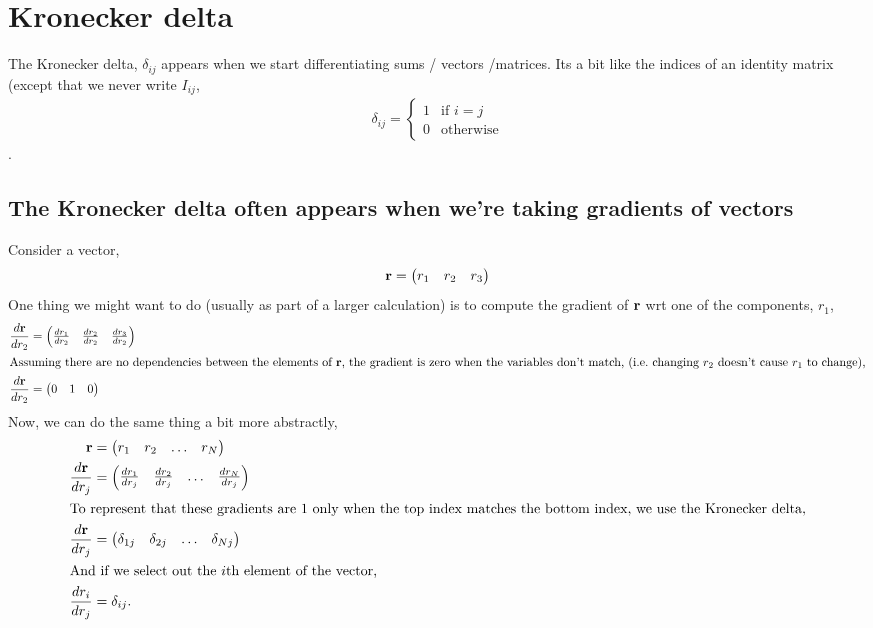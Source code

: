 \documentclass{article}
\newcommand{\dt}[2][]{\frac{d #1}{d #2}}
\begin{document}
\section{Kronecker delta}
The Kronecker delta, $\delta_{ij}$ appears when we start differentiating sums / vectors /matrices.
Its a bit like the indices of an identity matrix (except that we never write $I_{ij}$,
\begin{align}
  \delta_{ij} = \begin{cases}
    1 & \text{if } i=j\\
    0 & \text{otherwise}
  \end{cases}
\end{align}.

\subsection{The Kronecker delta often appears when we're taking gradients of vectors}
Consider a vector,
\begin{align}
  \mathbf{r} = \begin{pmatrix}
    r_1 & r_2 & r_3
  \end{pmatrix}
\end{align}
One thing we might want to do (usually as part of a larger calculation) is to compute the gradient of $\mathbf{r}$ wrt one of the components, $r_1$,
\begin{align}
  \dt[\r]{r_2} &= \begin{pmatrix}
    \dt[r_1]{r_2} & \dt[r_2]{r_2} & \dt[r_3]{r_2}
  \end{pmatrix}\\
  \intertext{Assuming there are no dependencies between the elements of $\r$, the gradient is zero when the variables don't match, (i.e.\ changing $r_2$ doesn't cause $r_1$ to change),}
  \dt[\r]{r_2} &= \begin{pmatrix}
    0 & 1 & 0
  \end{pmatrix}
\end{align}
Now, we can do the same thing a bit more abstractly,
\begin{align}
  \r &= \begin{pmatrix}
    r_1 & r_2 & \hdots & r_N
  \end{pmatrix}\\
  \dt[\r]{r_j} &= \begin{pmatrix}
    \dt[r_1]{r_j} & \dt[r_2]{r_j} & \hdots & \dt[r_N]{r_j}
  \end{pmatrix}\\
  \intertext{To represent that these gradients are $1$ only when the top index matches the bottom index, we use the Kronecker delta,}
  \dt[\r]{r_j} &= \begin{pmatrix}
    \delta_{1j} & \delta_{2j} & \hdots & \delta_{Nj}
  \end{pmatrix}\\
  \intertext{And if we select out the $i$th element of the vector,}
  \dt[r_i]{r_j} &= \delta_{ij}.
\end{align}
\end{document}
